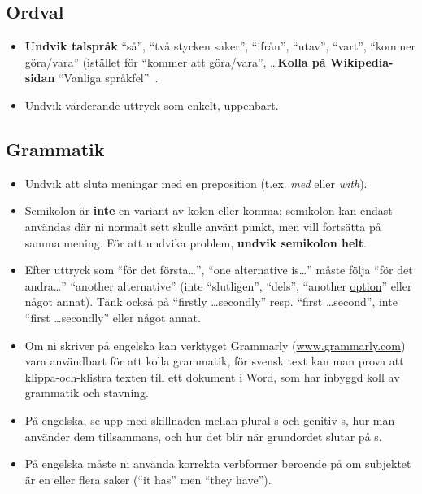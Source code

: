 \subsection*{Ordval}

\begin{itemize}
\item \textbf{Undvik talspråk} ``så'', ``två stycken saker'',
  ``ifrån'', ``utav'', ``vart'', ``kommer göra/vara'' (istället för
  ``kommer att göra/vara'', \ldots \textbf{Kolla på Wikipedia-sidan}
  ``Vanliga språkfel''~\cite{wp:sprakfel}.

\item    Undvik värderande uttryck som enkelt, uppenbart.
\end{itemize}

\subsection*{Grammatik}
\begin{itemize}
\item Undvik att sluta meningar med en preposition (t.ex. \emph{med} eller \emph{with}).  

\item    Semikolon är \textbf{inte} en variant av kolon eller komma; semikolon kan endast an\-vän\-das där ni normalt sett skulle använt punkt, men vill fortsätta på samma mening. För att undvika problem, \textbf{undvik semikolon helt}.

\item    Efter uttryck som ``för det första\ldots'', ``one alternative is\ldots'' måste följa ``för det andra\ldots'' ``another alternative'' (inte ``slutligen'', ``dels'', ``another \underline{option}'' eller något annat).  Tänk också på ``firstly \ldots secondly'' resp. ``first \ldots second'', inte ``first \ldots secondly'' eller något annat.

\item Om ni skriver på engelska kan verktyget Grammarly (\url{www.grammarly.com}) vara användbart för att kolla grammatik, för svensk text kan man prova att klippa-och-klistra texten till ett dokument i Word, som har inbyggd koll av grammatik och stavning.

\item På engelska, se upp med skillnaden mellan plural-s och genitiv-s, hur man an\-vän\-der dem tillsammans, och hur det blir när grundordet slutar på s. 

\item På engelska måste ni använda korrekta verbformer beroende på om subjektet är en eller flera saker (``it has'' men ``they have'').
\end{itemize}

